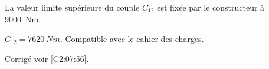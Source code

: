 La valeur limite supérieure du couple $C_{12}$ est fixée par le constructeur à \SI{9000}{Nm}.

\ifprof
 $C_{12} = \SI{7620}{Nm}$. Compatible avec le cahier des charges. 
\else
\fi







\ifprof
\else
\begin{flushright}
\footnotesize{Corrigé  voir \ref{C2:07:56}.}
\end{flushright}%
\fi 